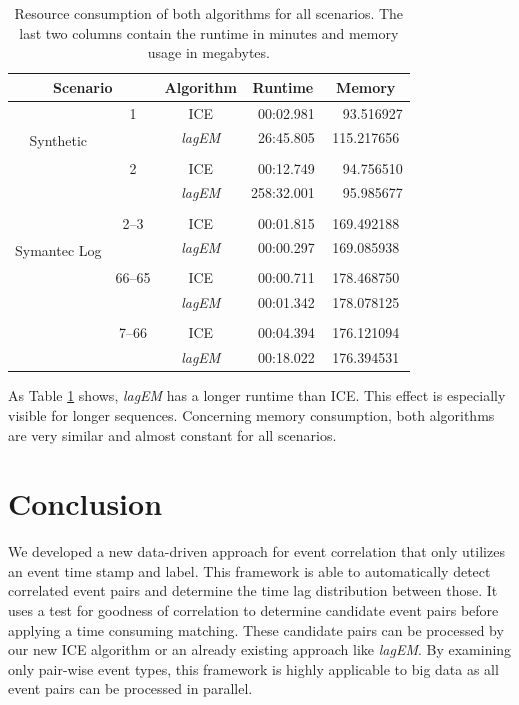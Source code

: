 \documentclass[conference]{IEEEtran}
\theoremstyle{examplestyle}
\begin{document}
\begin{table}[!tb]
	\centering
	\caption{Resource consumption of both algorithms for all scenarios. The last two columns contain the runtime in minutes and memory usage in megabytes.}
	\label{tbl:resources}
	\begin{tabular}{c c c c c}
		\multicolumn{2}{c}{\textbf{Scenario}} & \textbf{Algorithm} & \textbf{Runtime} & \textbf{Memory} \\
		\hline
		\multirow{4}{2mm}{\begin{sideways} Synthetic \hspace{1mm} \end{sideways}}
		&	1	& \ac{ICE}				&	~00:02.981	&	~~93.516927	\\
		& 		& \textit{lagEM}		&	~26:45.805	&	115.217656	\\
		\\[-1ex]
		&	2	& \ac{ICE}				&	~00:12.749	&	~~94.756510	\\
		&		& \textit{lagEM}		&	258:32.001	&	~~95.985677	\\
		\hline
		\\[-1ex]
		\multirow{4}{2mm}{\begin{sideways} Symantec Log \hspace{2mm} \end{sideways}}
		&  2--3 & \ac{ICE}				&	~00:01.815	&	169.492188 \\
		&		& \textit{lagEM}		&	~00:00.297	&	169.085938 \\[-1ex]
		\\
		& 66--65 & \ac{ICE}			&	~00:00.711	&	178.468750 \\
		&		& \textit{lagEM}		&	~00:01.342	&	178.078125 \\[-1ex]
		\\
		& 7--66 & \ac{ICE}			&	~00:04.394	&	176.121094 \\
		&		& \textit{lagEM}		&	~00:18.022	&	176.394531
	\end{tabular}

\end{table}



As Table \ref{tbl:resources} shows, \textit{lagEM} has a longer runtime than \ac{ICE}. This effect is especially visible for longer sequences. Concerning memory consumption, both algorithms are very similar and almost constant for all scenarios.



\section{Conclusion} \label{sec:conc}
We developed a new data-driven approach for event correlation that only utilizes an event time stamp and label. This framework is able to automatically detect correlated event pairs and determine the time lag distribution between those. It uses a test for goodness of correlation to determine candidate event pairs before applying a time consuming matching. These candidate pairs can be processed by our new \ac{ICE} algorithm or an already existing approach like \textit{lagEM}. By examining only pair-wise event types, this framework is highly applicable to big data as all event pairs can be processed in parallel.
\end{document}
